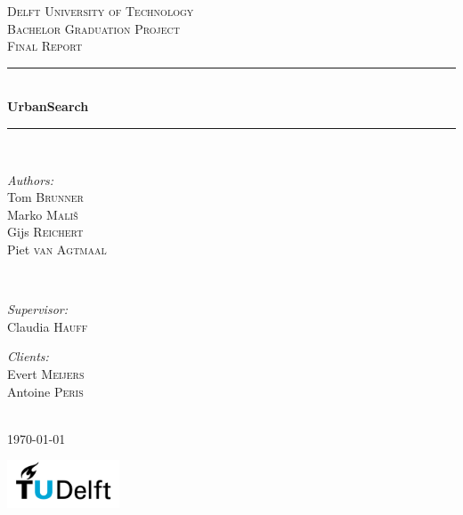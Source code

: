 \begin{titlepage}

\newcommand{\HRule}{\rule{\linewidth}{0.5mm}}

\center
 
\textsc{\LARGE Delft University of Technology}\\[1.5cm]
\textsc{\Large Bachelor Graduation Project}\\[0.5cm]
\textsc{\large Final Report}\\[0.5cm]

\HRule \\[0.4cm]
{ \huge \bfseries UrbanSearch}\\[0.4cm]
\HRule \\[1.5cm]
 

\begin{minipage}{0.4\textwidth}
\begin{flushleft} \large
\emph{Authors:}\\
Tom \textsc{Brunner}\\
Marko \textsc{Mali\v{s}}\\
Gijs \textsc{Reichert}\\
Piet \textsc{van Agtmaal}\\
\end{flushleft}
\end{minipage}
~
\begin{minipage}{0.4\textwidth}
\begin{flushright} \large
\emph{Supervisor:} \\
Claudia \textsc{Hauff}

\emph{Clients:} \\
Evert \textsc{Meijers}\\
Antoine \textsc{Peris}
\end{flushright}
\end{minipage}\\[4cm]


{\large \today}\\[3cm]

\vfill

\raggedright
\includegraphics[width=0.25\textwidth]{logo}

\end{titlepage}
